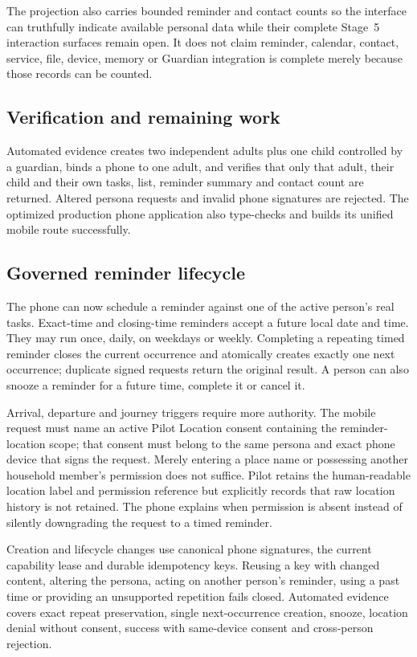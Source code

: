 The projection also carries bounded reminder and contact counts so the interface can truthfully
indicate available personal data while their complete Stage~5 interaction surfaces remain open.
It does not claim reminder, calendar, contact, service, file, device, memory or Guardian
integration is complete merely because those records can be counted.

\subsection{Verification and remaining work}

Automated evidence creates two independent adults plus one child controlled by a guardian, binds a
phone to one adult, and verifies that only that adult, their child and their own tasks, list,
reminder summary and contact count are returned.  Altered persona requests and invalid phone
signatures are rejected.  The optimized production phone application also type-checks and builds
its unified mobile route successfully.

\subsection{Governed reminder lifecycle}

The phone can now schedule a reminder against one of the active person's real tasks.  Exact-time
and closing-time reminders accept a future local date and time.  They may run once, daily, on
weekdays or weekly.  Completing a repeating timed reminder closes the current occurrence and
atomically creates exactly one next occurrence; duplicate signed requests return the original
result.  A person can also snooze a reminder for a future time, complete it or cancel it.

Arrival, departure and journey triggers require more authority.  The mobile request must name an
active Pilot Location consent containing the reminder-location scope; that consent must
belong to the same persona and exact phone device that signs the request.  Merely entering a place
name or possessing another household member's permission does not suffice.  Pilot retains the
human-readable location label and permission reference but explicitly records that raw location
history is not retained.  The phone explains when permission is absent instead of silently
downgrading the request to a timed reminder.

Creation and lifecycle changes use canonical phone signatures, the current capability lease and
durable idempotency keys.  Reusing a key with changed content, altering the persona, acting on
another person's reminder, using a past time or providing an unsupported repetition fails closed.
Automated evidence covers exact repeat preservation, single next-occurrence creation, snooze,
location denial without consent, success with same-device consent and cross-person rejection.

